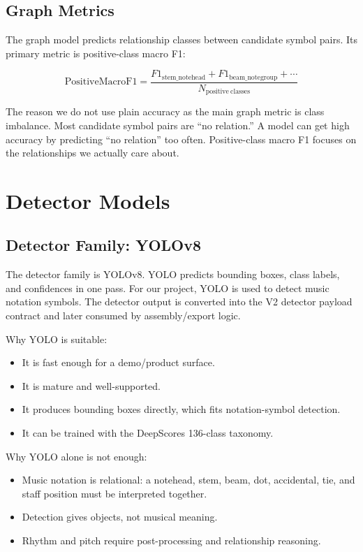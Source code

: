 \documentclass[11pt]{article}
\begin{document}
\subsection{Graph Metrics}

The graph model predicts relationship classes between candidate symbol pairs. Its primary metric is positive-class macro F1:

\[
\mathrm{PositiveMacroF1} =
\frac{F1_{\mathrm{stem\_notehead}} + F1_{\mathrm{beam\_notegroup}} + \cdots}{N_{\mathrm{positive\ classes}}}
\]

The reason we do not use plain accuracy as the main graph metric is class imbalance. Most candidate symbol pairs are ``no relation.'' A model can get high accuracy by predicting ``no relation'' too often. Positive-class macro F1 focuses on the relationships we actually care about.

\section{Detector Models}

\subsection{Detector Family: YOLOv8}

The detector family is YOLOv8. YOLO predicts bounding boxes, class labels, and confidences in one pass. For our project, YOLO is used to detect music notation symbols. The detector output is converted into the V2 detector payload contract and later consumed by assembly/export logic.

Why YOLO is suitable:

\begin{itemize}
  \item It is fast enough for a demo/product surface.
  \item It is mature and well-supported.
  \item It produces bounding boxes directly, which fits notation-symbol detection.
  \item It can be trained with the DeepScores 136-class taxonomy.
\end{itemize}

Why YOLO alone is not enough:

\begin{itemize}
  \item Music notation is relational: a notehead, stem, beam, dot, accidental, tie, and staff position must be interpreted together.
  \item Detection gives objects, not musical meaning.
  \item Rhythm and pitch require post-processing and relationship reasoning.
\end{itemize}
\end{document}
